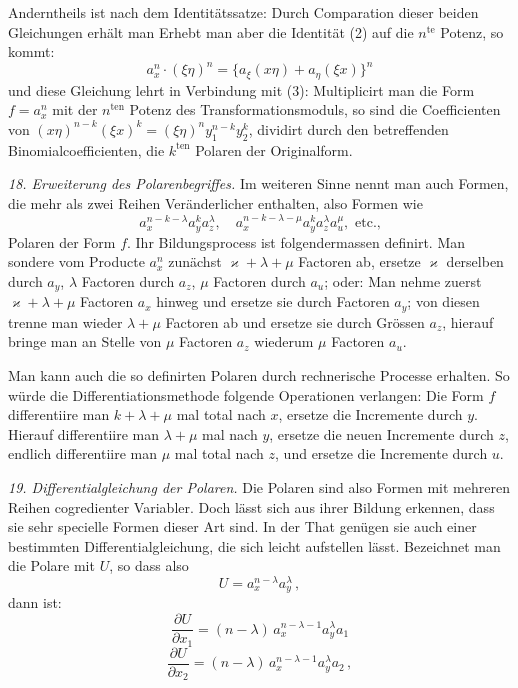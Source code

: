 Anderntheils ist nach dem Identitätssatze:
Durch Comparation dieser beiden Gleichungen erhält man
Erhebt man aber die Identität (2) auf die $n^{\text{te}}$ Potenz, so kommt:
\[
a_x^n \cdot (\xi\eta)^n = \{a_\xi(x\eta) + a_\eta(\xi x)\}^n
\]
und diese Gleichung lehrt in Verbindung mit (3):
\glqq Multiplicirt man die Form $f = a_x^n$ mit der $n^{\text{ten}}$ Potenz des Transformationsmoduls, so sind die Coefficienten von $(x\eta)^{n-k}(\xi x)^k = (\xi\eta)^n y_1^{n-k} y_2^k$, dividirt durch den betreffenden Binomialcoefficienten, die $k^{\text{ten}}$ Polaren der Originalform.\grqq{}

\textit{18. Erweiterung des Polarenbegriffes.} Im weiteren Sinne nennt man auch Formen, die mehr als zwei Reihen Veränderlicher enthalten, also Formen wie
\[
a_x^{n-k-\lambda}a_y^k a_z^\lambda, \quad a_x^{n-k-\lambda-\mu}a_y^k a_z^\lambda a_u^\mu, \text{ etc.,}
\]
Polaren der Form $f$. Ihr Bildungsprocess ist folgendermassen definirt. Man sondere vom Producte $a_x^n$ zunächst $\varkappa+\lambda+\mu$ Factoren ab, ersetze $\varkappa$ derselben durch $a_y$, $\lambda$ Factoren durch $a_z$, $\mu$ Factoren durch $a_u$; oder: Man nehme zuerst $\varkappa+\lambda+\mu$ Factoren $a_x$ hinweg und ersetze sie durch Factoren $a_y$; von diesen trenne man wieder $\lambda+\mu$ Factoren ab und ersetze sie durch Grössen $a_z$, hierauf bringe man an Stelle von $\mu$ Factoren $a_z$ wiederum $\mu$ Factoren $a_u$.

Man kann auch die so definirten Polaren durch rechnerische Processe erhalten. So würde die Differentiationsmethode folgende Operationen verlangen: Die Form $f$ differentiire man $k+\lambda+\mu$ mal total nach $x$, ersetze die Incremente durch $y$.
Hierauf differentiire man $\lambda+\mu$ mal nach $y$, ersetze die neuen Incremente durch $z$, endlich differentiire man $\mu$ mal total nach $z$, und ersetze die Incremente durch $u$.

\textit{19. Differentialgleichung der Polaren.} Die Polaren sind also Formen mit mehreren Reihen cogredienter Variabler. Doch lässt sich aus ihrer Bildung erkennen, dass sie sehr specielle Formen dieser Art sind. In der That genügen sie auch einer bestimmten Differentialgleichung, die sich leicht aufstellen lässt. Bezeichnet man die Polare mit $U$, so dass also
\[
U = a_x^{n-\lambda}a_y^\lambda\,,
\]
dann ist:
\[
\frac{\partial U}{\partial x_1} = (n-\lambda)\,a_x^{n-\lambda-1}a_y^\lambda a_1
\]
\[
\frac{\partial U}{\partial x_2} = (n-\lambda)\,a_x^{n-\lambda-1}a_y^\lambda a_2\,,
\]


